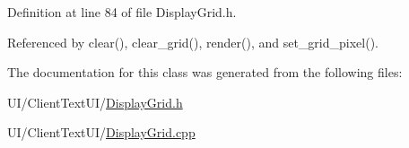 Definition at line 84 of file Display\+Grid.\+h.



Referenced by clear(), clear\+\_\+grid(), render(), and set\+\_\+grid\+\_\+pixel().



The documentation for this class was generated from the following files\+:\begin{DoxyCompactItemize}
\item 
U\+I/\+Client\+Text\+U\+I/\hyperlink{DisplayGrid_8h}{Display\+Grid.\+h}\item 
U\+I/\+Client\+Text\+U\+I/\hyperlink{DisplayGrid_8cpp}{Display\+Grid.\+cpp}\end{DoxyCompactItemize}
